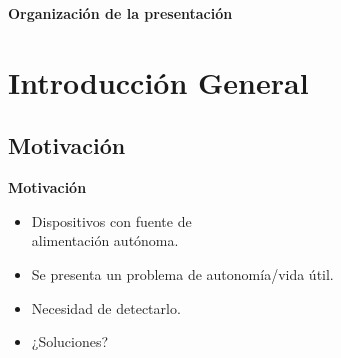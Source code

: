 \documentclass[aspectratio=43, handout]{beamer}
\begin{document}

\begin{frame}{\textbf{\LARGE{Organización de la presentación}}}
\fontsize{13pt}{13}\selectfont
  \tableofcontents
\end{frame}
%
%

\section{Introducción General}

\subsection[Motivación]{Motivación}

\begin{frame}{\textbf{\LARGE{Motivación}}}
\fontsize{16pt}{16}\selectfont
	\begin{itemize}
		\item Dispositivos con fuente de\\alimentación autónoma.
		\vspace{10px}
		\item Se presenta un problema de autonomía/vida útil.
		\vspace{10px}
		\item Necesidad de detectarlo.
		\vspace{10px}
		\item ¿Soluciones?
	\end{itemize}
\end{frame}
\end{document}
